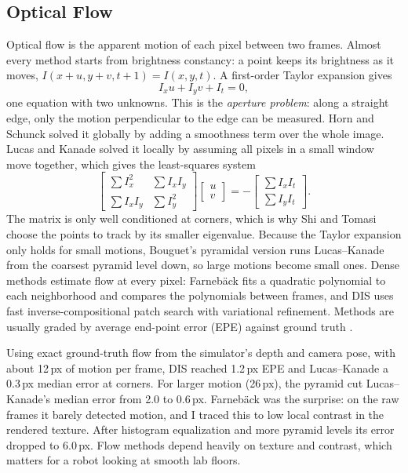 \documentclass[11pt]{article}
\begin{document}
\subsection{Optical Flow}
Optical flow is the apparent motion of each pixel between two frames. Almost every method starts from brightness
constancy: a point keeps its brightness as it moves, $I(x+u, y+v, t+1) = I(x,y,t)$. A first-order Taylor expansion gives
\begin{equation}
I_x u + I_y v + I_t = 0,
\end{equation}
one equation with two unknowns. This is the \emph{aperture problem}: along a straight edge, only the motion perpendicular to
the edge can be measured. Horn and Schunck \cite{horn} solved it globally by adding a smoothness term over the whole image.
Lucas and Kanade \cite{lucas} solved it locally by assuming all pixels in a small window move together, which gives the
least-squares system
\begin{equation}
\begin{bmatrix} \sum I_x^2 & \sum I_x I_y \\ \sum I_x I_y & \sum I_y^2 \end{bmatrix}
\begin{bmatrix} u \\ v \end{bmatrix} = -\begin{bmatrix} \sum I_x I_t \\ \sum I_y I_t \end{bmatrix}.
\end{equation}
The matrix is only well conditioned at corners, which is why Shi and Tomasi \cite{shi} choose the points to track by its
smaller eigenvalue. Because the Taylor expansion only holds for small motions, Bouguet's pyramidal version \cite{bouguet}
runs Lucas--Kanade from the coarsest pyramid level down, so large motions become small ones. Dense methods estimate flow at
every pixel: Farneb\"ack \cite{farneback} fits a quadratic polynomial to each neighborhood and compares the polynomials
between frames, and DIS \cite{dis} uses fast inverse-compositional patch search with variational refinement. Methods are
usually graded by average end-point error (EPE) against ground truth \cite{baker}.

Using exact ground-truth flow from the simulator's depth and camera pose, with about 12\,px of motion per frame, DIS reached 1.2\,px EPE and Lucas--Kanade a 0.3\,px median error at corners. For larger motion
(26\,px), the pyramid cut Lucas--Kanade's median error from 2.0 to 0.6\,px. Farneb\"ack was the surprise: on the raw frames it
barely detected motion, and I traced this to low local contrast in the rendered texture. After histogram equalization and
more pyramid levels its error dropped to 6.0\,px. Flow methods depend heavily on texture and contrast, which matters
for a robot looking at smooth lab floors.
\end{document}
